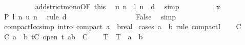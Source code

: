\begin{isabellebody}
\ \ \ \ \ \ \ \ \isamarkupfalse%
\ add{\isacharunderscore}{\kern0pt}strict{\isacharunderscore}{\kern0pt}mono{\isacharbrackleft}{\kern0pt}OF\ this{\isacharbrackright}{\kern0pt}\ \isamarkupfalse%
\ {\isachardoublequoteopen}u\ n\ {\isacharminus}{\kern0pt}\ l\ n\ {\isacharless}{\kern0pt}\ d{\isachardoublequoteclose}\ \isamarkupfalse%
\ simp\isanewline
\ \ \ \ \ \ \ \ \isamarkupfalse%
\ x\ \isamarkupfalse%
\ {\isachardoublequoteopen}P\ {\isacharparenleft}{\kern0pt}l\ n{\isacharparenright}{\kern0pt}\ {\isacharparenleft}{\kern0pt}u\ n{\isacharparenright}{\kern0pt}{\isachardoublequoteclose}\ \isamarkupfalse%
\ {\isacharparenleft}{\kern0pt}rule\ d{\isacharparenright}{\kern0pt}\isanewline
\ \ \ \ \ \ \isamarkupfalse%
\isanewline
\ \ \ \ \isacommand{{\isacharbraceright}{\kern0pt}}\isamarkupfalse%
\isanewline
\ \ \ \ \isamarkupfalse%
\ \isamarkupfalse%
\ False\ \isamarkupfalse%
\ simp\isanewline
\ \ \isamarkupfalse%
\isanewline
{}\isamarkupfalse%
%
\endisatagproof
{\isafoldproof}%
%
\isadelimproof
\isanewline
%
\endisadelimproof
\isanewline
{}\isamarkupfalse%
\ compact{\isacharunderscore}{\kern0pt}Icc{\isacharbrackleft}{\kern0pt}simp{\isacharcomma}{\kern0pt}\ intro{\isacharbrackright}{\kern0pt}{\isacharcolon}{\kern0pt}\ {\isachardoublequoteopen}compact\ {\isacharbraceleft}{\kern0pt}a\ {\isachardot}{\kern0pt}{\isachardot}{\kern0pt}\ b{\isacharcolon}{\kern0pt}{\isacharcolon}{\kern0pt}real{\isacharbraceright}{\kern0pt}{\isachardoublequoteclose}\isanewline
%
\isadelimproof
%
\endisadelimproof
%
\isatagproof
{}\isamarkupfalse%
\ {\isacharparenleft}{\kern0pt}cases\ {\isachardoublequoteopen}a\ {\isasymle}\ b{\isachardoublequoteclose}{\isacharcomma}{\kern0pt}\ rule\ compactI{\isacharparenright}{\kern0pt}\isanewline
\ \ \isamarkupfalse%
\ C\isanewline
\ \ \isamarkupfalse%
\ C{\isacharcolon}{\kern0pt}\ {\isachardoublequoteopen}a\ {\isasymle}\ b{\isachardoublequoteclose}\ {\isachardoublequoteopen}{\isasymforall}t{\isasymin}C{\isachardot}{\kern0pt}\ open\ t{\isachardoublequoteclose}\ {\isachardoublequoteopen}{\isacharbraceleft}{\kern0pt}a{\isachardot}{\kern0pt}{\isachardot}{\kern0pt}b{\isacharbraceright}{\kern0pt}\ {\isasymsubseteq}\ {\isasymUnion}C{\isachardoublequoteclose}\isanewline
\ \ \isamarkupfalse%
\ T\ \ {\isachardoublequoteopen}T\ {\isacharequal}{\kern0pt}\ {\isacharbraceleft}{\kern0pt}a\ {\isachardot}{\kern0pt}{\isachardot}{\kern0pt}\ b{\isacharbraceright}{\kern0pt}{\isachardoublequoteclose}\isanewline

\end{isabellebody}
